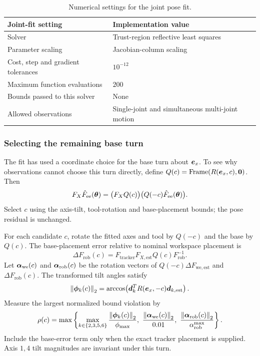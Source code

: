 \documentclass[../main.tex]{subfiles}
\begin{document}
\begin{table}[H]
\centering\small
\begin{tabular}{@{}ll@{}}
\toprule
Joint-fit setting & Implementation value \\\midrule
Solver & Trust-region reflective least squares \\
Parameter scaling & Jacobian-column scaling \\
Cost, step and gradient tolerances & $10^{-12}$ \\
Maximum function evaluations & $200$ \\
Bounds passed to this solver & None \\
Allowed observations & Single-joint and simultaneous multi-joint motion \\
\bottomrule
\end{tabular}
\caption{Numerical settings for the joint pose fit.}
\end{table}

\subsubsection{Selecting the remaining base turn}\label{sec:math-gauge-choice}
The fit has used a coordinate choice for the base turn about $\bm{e}_x$. To see why observations cannot choose this turn directly, define $Q(c)=\operatorname{Frame}(R(\bm{e}_x,c),\bm{0})$. Then
\begin{equation}\label{eq:turn-insert}
F_X\hat F_{\mathrm{ee}}(\bm{\theta})
=\bigl(F_XQ(c)\bigr)\bigl(Q(-c)\hat F_{\mathrm{ee}}(\bm{\theta})\bigr).
\end{equation}
Select $c$ using the axis-tilt, tool-rotation and base-placement bounds; the pose residual is unchanged.

For each candidate $c$, rotate the fitted axes and tool by $Q(-c)$ and the base by $Q(c)$. The base-placement error relative to nominal workspace placement is
\begin{equation*}
\Delta F_{\mathrm{rob}}(c)=F_{\mathrm{tracker}}F_{X,\mathrm{est}}Q(c)F_{\mathrm{rob}}^{-1}.
\end{equation*}
Let $\bm{\alpha}_{\mathrm{we}}(c)$ and $\bm{\alpha}_{\mathrm{rob}}(c)$ be the rotation vectors of $Q(-c)\Delta F_{\mathrm{we},\mathrm{est}}$ and $\Delta F_{\mathrm{rob}}(c)$. The transformed tilt angles satisfy
\begin{equation*}
\left\|\bm{\phi}_k(c)\right\|_2=\arccos\!\left(\bm{d}_k^TR(\bm{e}_x,-c)\bm{d}_{k,\mathrm{est}}\right).
\end{equation*}
Measure the largest normalized bound violation by
\begin{equation*}
\rho(c)=\max\left\{
\max_{k\in\{2,3,5,6\}}\frac{\left\|\bm{\phi}_k(c)\right\|_2}{\phi_{\max}},\
\frac{\left\|\bm{\alpha}_{\mathrm{we}}(c)\right\|_2}{0.01},\
\frac{\left\|\bm{\alpha}_{\mathrm{rob}}(c)\right\|_2}{\alpha^{\max}_{\mathrm{rob}}}
\right\}.
\end{equation*}
Include the base-error term only when the exact tracker placement is supplied. Axis $1,4$ tilt magnitudes are invariant under this turn.
\end{document}
